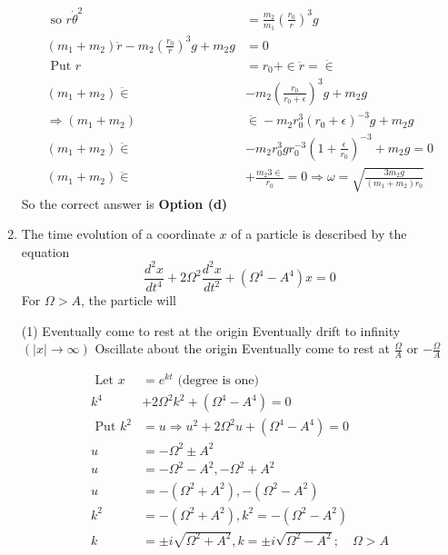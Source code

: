 \begin{enumerate}
\begin{answer}
\begin{align*}
	\text { so } r \dot{\theta}^{2}&=\frac{m_{2}}{m_{1}}\left(\frac{r_{0}}{r}\right)^{3} g \\
	\left(m_{1}+m_{2}\right) \ddot{r}-m_{2}\left(\frac{r_{0}}{r}\right)^{3} g+m_{2} g&=0\\
\text{	Put }r&=r_{0}+\in \ddot{r}=\ddot{\in}\\
	\left(m_{1}+m_{2}\right) \ddot{\in}&-m_{2}\left(\frac{r_{0}}{r_{0}+\epsilon}\right)^{3} g+m_{2} g \\
	\Rightarrow\left(m_{1}+m_{2}\right)& \ddot{\in}-m_{2} r_{0}^{3}\left(r_{0}+\epsilon\right)^{-3} g+m_{2} g \\
	\left(m_{1}+m_{2}\right) \ddot{\in}&-m_{2} r_{0}^{3} g r_{0}^{-3}\left(1+\frac{\epsilon}{r_{0}}\right)^{-3}+m_{2} g=0 \\
	\left(m_{1}+m_{2}\right) \ddot{\in}&+\frac{m_{2} 3 \in}{r_{0}}=0 \Rightarrow \omega=\sqrt{\frac{3 m_{2} g}{\left(m_{1}+m_{2}\right) r_{0}}}
	\end{align*}
	So the correct answer is \textbf{Option (d)}
\end{answer}
\item  The time evolution of a coordinate $x$ of a particle is described by the equation
$$
\frac{d^{2} x}{d t^{4}}+2 \Omega^{2} \frac{d^{2} x}{d t^{2}}+\left(\Omega^{4}-A^{4}\right) x=0
$$
For $\Omega>A$, the particle will
 \begin{tasks}(1)
	\task[\textbf{a.}]Eventually come to rest at the origin
	\task[\textbf{b.}] Eventually drift to infinity $(|x| \rightarrow \infty)$
	\task[\textbf{c.}] Oscillate about the origin
	\task[\textbf{d.}] Eventually come to rest at $\frac{\Omega}{A}$ or $-\frac{\Omega}{A}$
\end{tasks}
\begin{answer}
	\begin{align*}
\text{	Let }x&=e^{k t}
\text{	(degree is one)}\\
k^{4}&+2 \Omega^{2} k^{2}+\left(\Omega^{4}-A^{4}\right)=0 \\
\text { Put } k^{2}&=u \Rightarrow u^{2}+2 \Omega^{2} u+\left(\Omega^{4}-A^{4}\right)=0 \\
u&=-\Omega^{2} \pm A^{2} \\
u&=-\Omega^{2}-A^{2},-\Omega^{2}+A^{2} \\
u&=-\left(\Omega^{2}+A^{2}\right),-\left(\Omega^{2}-A^{2}\right) \\
k^{2}&=-\left(\Omega^{2}+A^{2}\right), k^{2}=-\left(\Omega^{2}-A^{2}\right)\\
k&=\pm i \sqrt{\Omega^{2}+A^{2}}, k=\pm i \sqrt{\Omega^{2}-A^{2}} ; \quad \Omega>A\\

\end{align*}
\end{answer}
\end{enumerate}
